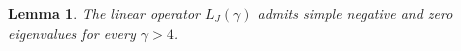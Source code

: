 \documentclass[12pt,reqno]{amsart}
\numberwithin{equation}{section}
\newtheorem{lemma}{Lemma}
\begin{document}








\begin{lemma}
    \label{lem-exact-2}
The linear operator $L_J(\gamma)$ admits simple negative and zero eigenvalues for every $\gamma > 4$.
\end{lemma}
\end{document}
